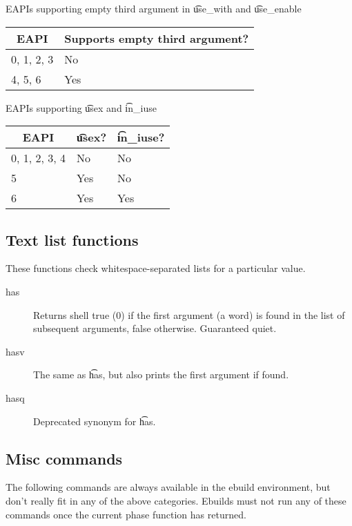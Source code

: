 \begin{centertable}{EAPIs supporting empty third argument in \t{use_with} and \t{use_enable}}
    \label{tab:use-with-third-arg}
    \begin{tabular}{ll}
      \toprule
      \multicolumn{1}{c}{\textbf{EAPI}} &
      \multicolumn{1}{c}{\textbf{Supports empty third argument?}} \\
      \midrule
      0, 1, 2, 3        & No  \\
      4, 5, 6           & Yes \\
      \bottomrule
    \end{tabular}
\end{centertable}

\begin{centertable}{EAPIs supporting \t{usex} and \t{in_iuse}}
    \label{tab:use-list-functions}
    \begin{tabular}{lll}
      \toprule
      \multicolumn{1}{c}{\textbf{EAPI}} &
      \multicolumn{1}{c}{\textbf{\t{usex}?}} &
      \multicolumn{1}{c}{\textbf{\t{in_iuse}?}} \\
      \midrule
      0, 1, 2, 3, 4     & No  & No  \\
      5                 & Yes & No  \\
      6                 & Yes & Yes \\
      \bottomrule
    \end{tabular}
\end{centertable}

\subsection{Text list functions}
These functions check whitespace-separated lists for a particular value.

\begin{description}
\item[has] Returns shell true (0) if the first argument (a word) is found in the list of subsequent
    arguments, false otherwise. Guaranteed quiet.
\item[hasv] The same as \t{has}, but also prints the first argument if found.
\item[hasq] Deprecated synonym for \t{has}.
\end{description}

\subsection{Misc commands}
The following commands are always available in the ebuild environment, but don't really fit in any
of the above categories. Ebuilds must not run any of these commands once the current phase function
has returned.

